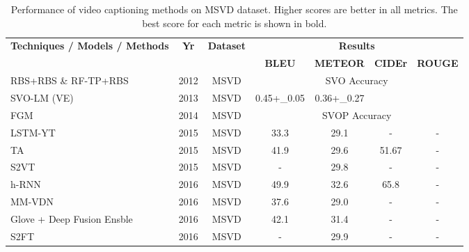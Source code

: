 \documentclass[10pt,journal,compsoc]{IEEEtran}
\begin{document}
\begin{table*}[htbp]
  \centering
  \small
  \setlength{\tabcolsep}{10.0pt}       %
  \caption{Performance of video captioning methods on MSVD dataset. Higher scores are better in all metrics. The best score for each metric is shown in bold. }
  \vspace{-2mm}
  \begin{tabular}{|p{15.43em}|c|c|c|c|c|c|}
    \hline
    \multirow{2}[1]{*}{\textbf{Techniques / Models / Methods}} & \multirow{2}[1]{*}{\textbf{Yr}} & \multirow{2}[1]{*}{\textbf{Dataset}} & \multicolumn{4}{c|}{\textbf{Results}} \\
  \cline{4-7}    \multicolumn{1}{|l|}{} & & & \textbf{BLEU} & \textbf{METEOR} & \textbf{CIDEr} & \textbf{ROUGE} \\
    \hline
    RBS+RBS \& RF-TP+RBS \cite{hanckmann2012automated} & 2012  & MSVD  & \multicolumn{4}{c|}{SVO Accuracy} \\
    \hline 
    SVO-LM (VE)~\cite{krishnamoorthy2013generating} & 2013  & MSVD  & 0.45+\_0.05 & 0.36+\_0.27 &       &  \\
    \hline
    FGM~\cite{thomason2014integrating}  & 2014  & MSVD  & \multicolumn{4}{c|}{SVOP Accuracy} \\
    \hline 
    LSTM-YT~\cite{venugopalan2014translating} & 2015  & {MSVD} & 33.3  & 29.1  & -     & - \\
    \hline
    TA~\cite{yao2015describing} & 2015  & MSVD  & 41.9  & 29.6  & 51.67  & - \\
    \hline
    S2VT~\cite{venugopalan2015sequence} & 2015  & {MSVD} & -     & 29.8  & -     & - \\
    \hline
    \multicolumn{1}{|l|}{h-RNN~\cite{yu2016video}}  & 2016  & {MSVD} & 49.9  & 32.6  & 65.8  & - \\
    \hline 
    \multicolumn{1}{|l|}{MM-VDN~\cite{xu2015multi}}  & 2016  & MSVD  & 37.6  & 29.0  & -     & - \\
    \hline
     \multicolumn{1}{|l|}{Glove + Deep Fusion Ensble~\cite{venugopalan2016improving}}  & 2016  & MSVD  & 42.1 & 31.4  & -     & - \\
    \hline
     \multicolumn{1}{|l|}{S2FT~\cite{liu2016boosting}}  & 2016  & MSVD  & -  & 29.9  & - & - \\
    \hline

\end{tabular}
\end{table*}
\end{document}
